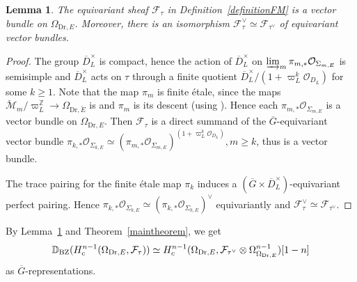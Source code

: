 \documentclass[a4paper,10pt]{amsart}
\theoremstyle{remark}
\theoremstyle{definition}
\theoremstyle{plain}
\newtheorem{lemma}[theorem]{Lemma}
\numberwithin{equation}{section}
\newcommand{\bbD}{{\mathbb D}}
\newcommand{\bbZ}{{\mathbb Z}}
\newcommand{\calF}{{\mathcal F}}
\newcommand{\calM}{{\mathcal M}}
\newcommand{\calO}{{\mathcal O}}
\newcommand{\ovD}{{\overline D}}
\newcommand{\ovG}{{\overline G}}
\begin{document}
\begin{lemma}\label{lemmaFMvectorbundle}
	The equivariant sheaf $\calF_{\tau}$ in Definition~\ref{definitionFM} is a vector bundle on $\Omega_{\mathrm{Dr},E}$. Moreover, there is an isomorphism $\calF_{\tau}^{\vee}\simeq \calF_{\tau^{\vee}}$ of equivariant vector bundles.
\end{lemma}
\begin{proof}
	The group $\ovD_L^{\times}$ is compact, hence the action of $\ovD_L^{\times}$ on $\varinjlim_m\pi_{m,*}\calO_{\Sigma_{m,E}}$ is semisimple and $\ovD_L^{\times}$ acts on $\tau$ through a finite quotient $\ovD_L^{\times}/(1+\varpi_L^{k}\calO_{D_L})$ for some $k\geq 1$.  Note that the map $\pi_m$ is finite \'etale, since the maps $\breve{\calM}_m/\varpi_L^{\bbZ}\rightarrow \Omega_{\mathrm{Dr},\breve{E}}$ is and $\pi_m$ is its descent (using \cite[Lem.~1.1.5]{conrad1999irreducible}). Hence each $\pi_{m,*}\calO_{\Sigma_{m,E}}$ is a vector bundle on $\Omega_{\mathrm{Dr},E}$. Then $\calF_{\tau}$ is a direct summand of the $\ovG$-equivariant vector bundle $\pi_{k,*}\calO_{\Sigma_{k,E}}\simeq (\pi_{m,*}\calO_{\Sigma_{m,E}})^{(1+\varpi_L^k\calO_{D_L})},m\geq k$, thus is a vector bundle.

	The trace pairing \cite[\href{https://stacks.math.columbia.edu/tag/0BVH}{Tag 0BVH}]{stacks-project} for the finite \'etale map $\pi_k$ induces a $(\ovG\times \ovD_L^{\times})$-equivariant perfect pairing. Hence $\pi_{k,*}\calO_{\Sigma_{k,E}}\simeq (\pi_{k,*}\calO_{\Sigma_{k,E}})^{\vee}$ equivariantly and $\calF_{\tau}^{\vee}\simeq \calF_{\tau^{\vee}}$.
\end{proof}
By Lemma~\ref{lemmaFMvectorbundle} and Theorem~\ref{maintheorem}, we get \
	\begin{equation}\label{equationBZdualFM}
		\bbD_{\rm BZ}(H^{n-1}_c(\Omega_{\mathrm{Dr},E},\calF_{\tau}))\simeq H^{n-1}_c(\Omega_{\mathrm{Dr},E},\calF_{\tau^{\vee}}\otimes \Omega^{n-1}_{\Omega_{\mathrm{Dr},E}})[1-n]	
	\end{equation}
as $\ovG$-representations.
\end{document}
